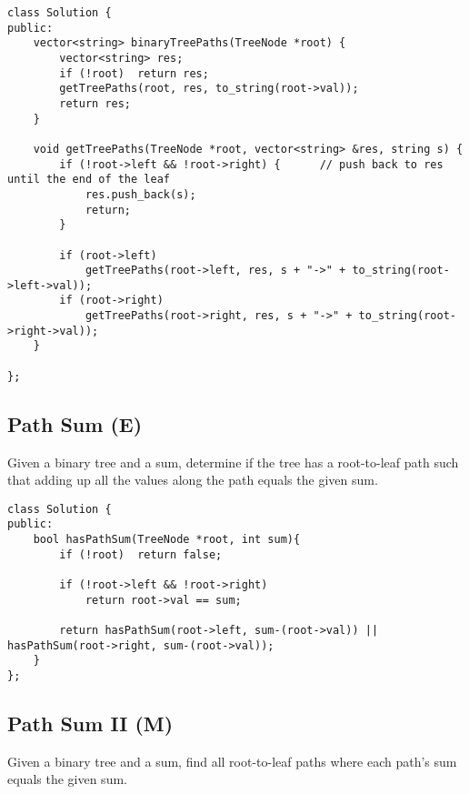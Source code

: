 \begin{lstlisting}
class Solution {
public:
    vector<string> binaryTreePaths(TreeNode *root) {
        vector<string> res;
        if (!root)  return res;
        getTreePaths(root, res, to_string(root->val));
        return res;
    }
    
    void getTreePaths(TreeNode *root, vector<string> &res, string s) {
        if (!root->left && !root->right) {      // push back to res until the end of the leaf
            res.push_back(s);
            return;
        }
        
        if (root->left)
            getTreePaths(root->left, res, s + "->" + to_string(root->left->val));
        if (root->right)
            getTreePaths(root->right, res, s + "->" + to_string(root->right->val));
    }
    
};
\end{lstlisting}


\subsection{Path Sum (E)}
Given a binary tree and a sum, determine if the tree has a root-to-leaf path such that adding up all the values along the path equals the given sum. \\

\begin{lstlisting}
class Solution {
public:
    bool hasPathSum(TreeNode *root, int sum){
        if (!root)  return false;
        
        if (!root->left && !root->right)
            return root->val == sum;
            
        return hasPathSum(root->left, sum-(root->val)) || hasPathSum(root->right, sum-(root->val));
    }
};
\end{lstlisting}


\subsection{Path Sum II (M)}
Given a binary tree and a sum, find all root-to-leaf paths where each path's sum equals the given sum. \\
 
